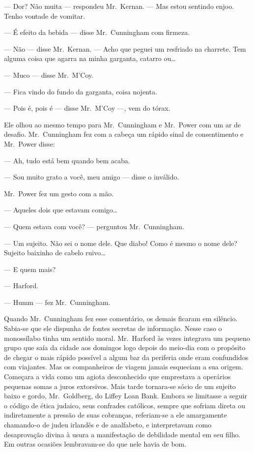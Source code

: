 --- Dor?  Não muita --- respondeu Mr.~Kernan.  --- Mas estou sentindo enjoo.
Tenho vontade de vomitar.

--- É efeito da bebida --- disse Mr.~Cunningham com firmeza.

--- Não --- disse Mr.~Kernan.  --- Acho que peguei um resfriado na charrete.
Tem alguma coisa que agarra na minha garganta, catarro ou\ldots{}

--- Muco --- disse Mr.~M’Coy.

--- Fica vindo do fundo da garganta, coisa nojenta.

--- Pois é, pois é --- disse Mr.~M’Coy ---, vem do tórax.

Ele olhou ao mesmo tempo para Mr.~Cunningham e Mr.~Power com um ar de desafio.
Mr.~Cunningham fez com a cabeça um rápido sinal de consentimento e Mr.~Power
disse:

--- Ah, tudo está bem quando bem acaba.

--- Sou muito grato a você, meu amigo --- disse o inválido.  

Mr.~Power fez um gesto com a mão.

--- Aqueles dois que estavam comigo\ldots{}

--- Quem estava com você? --- perguntou Mr.~Cunningham.

--- Um sujeito.  Não sei o nome dele.  Que diabo!  Como é mesmo o nome dele?
Sujeito baixinho de cabelo ruivo\ldots{}

--- E quem mais?

--- Harford.

--- Humm --- fez Mr.~Cunningham.

Quando Mr.~Cunningham fez esse comentário, os demais ficaram em silêncio.
Sabia-se que ele dispunha de fontes secretas de informação.  Nesse caso o
monossílabo tinha um sentido moral.  Mr.~Harford às vezes integrava um pequeno
grupo que saía da cidade aos domingos logo depois do meio-dia com o propósito
de chegar o mais rápido possível a algum bar da periferia onde eram confundidos
com viajantes.  Mas os companheiros de viagem jamais esqueciam a sua origem.
Começara a vida como um agiota desconhecido que emprestava a operários pequenas
somas a juros extorsivos.  Mais tarde tornara-se sócio de um sujeito baixo e
gordo, Mr.~Goldberg, do Liffey Loan Bank.  Embora se limitasse a seguir o
código de ética judaico, seus confrades católicos, sempre que sofriam direta ou
indiretamente a pressão de suas cobranças, referiam-se a ele amargamente
chamando-o de judeu irlandês e de analfabeto, e interpretavam como desaprovação
divina à usura a manifestação de debilidade mental em seu filho.  Em outras
ocasiões lembravam-se do que nele havia de bom.

